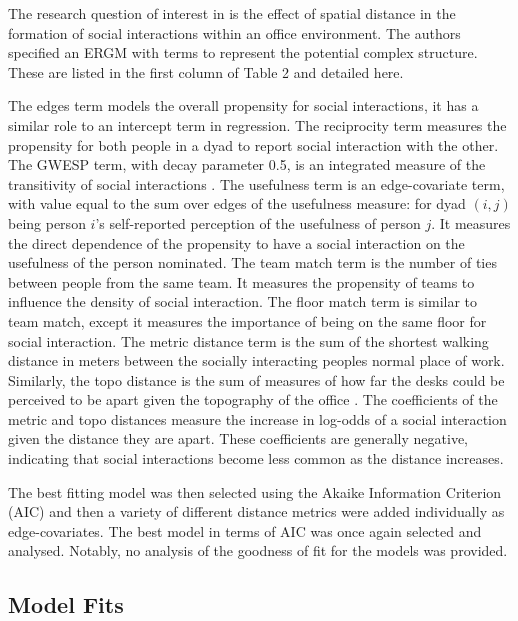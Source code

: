 \documentclass[
]{statsoc}
\begin{document}
The research question of interest in \cite{Sailer2012} is the effect of
spatial distance in the formation of social interactions within an
office environment. The authors specified an ERGM with terms to
represent the potential complex structure. These are listed in the first
column of Table 2 and detailed here.

The edges term models the overall propensity for social interactions, it
has a similar role to an intercept term in regression. The reciprocity
term measures the propensity for both people in a dyad to report social
interaction with the other. The GWESP term, with decay parameter 0.5, is
an integrated measure of the transitivity of social interactions
\citep[See][for a detailed
explanation]{snijders2006}. The usefulness term is an edge-covariate
term, with value equal to the sum over edges of the usefulness measure:
for dyad \((i,j)\) being person \(i\)'s self-reported perception of the
usefulness of person \(j\). It measures the direct dependence of the
propensity to have a social interaction on the usefulness of the person
nominated. The team match term is the number of ties between people from
the same team. It measures the propensity of teams to influence the
density of social interaction. The floor match term is similar to team
match, except it measures the importance of being on the same floor for
social interaction. The metric distance term is the sum of the shortest
walking distance in meters between the socially interacting peoples
normal place of work. Similarly, the topo distance is the sum of
measures of how far the desks could be perceived to be apart given the
topography of the office
\citep[See][for precise definitions]{Sailer2012}. The coefficients of
the metric and topo distances measure the increase in log-odds of a
social interaction given the distance they are apart. These coefficients
are generally negative, indicating that social interactions become less
common as the distance increases.

The best fitting model was then selected using the Akaike Information
Criterion (AIC) and then a variety of different distance metrics were
added individually as edge-covariates. The best model in terms of AIC
was once again selected and analysed. Notably, no analysis of the
goodness of fit for the models was provided.

\subsection{Model Fits}
\end{document}
